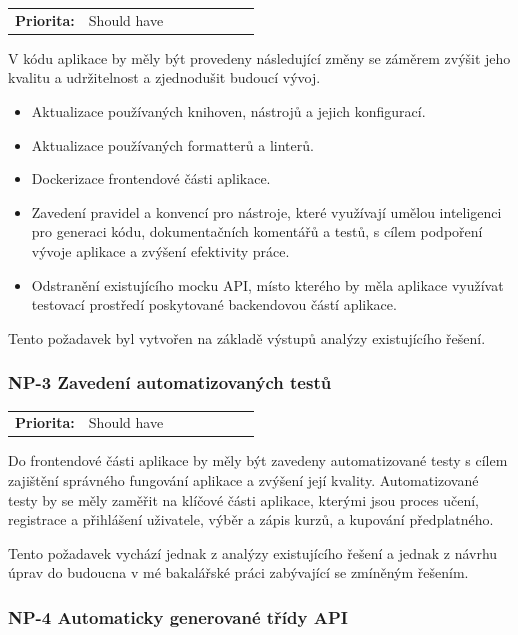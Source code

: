 \begin{tabular}{lp{0.7\linewidth}}
    \textbf{Priorita:} & Should have \\
\end{tabular}

V kódu aplikace by měly být provedeny následující změny se záměrem zvýšit jeho kvalitu a udržitelnost a zjednodušit budoucí vývoj.

\begin{itemize}
    \item Aktualizace používaných knihoven, nástrojů a jejich konfigurací.
    \item Aktualizace používaných formatterů a linterů.
    \item Dockerizace frontendové části aplikace.
    \item Zavedení pravidel a konvencí pro nástroje, které využívají umělou inteligenci pro generaci kódu, dokumentačních komentářů a testů, s cílem podpoření vývoje aplikace a zvýšení efektivity práce.
    \item Odstranění existujícího mocku API, místo kterého by měla aplikace využívat testovací prostředí poskytované backendovou částí aplikace.
\end{itemize}

Tento požadavek byl vytvořen na základě výstupů analýzy existujícího řešení.

\subsubsection{NP-3 Zavedení automatizovaných testů}

\begin{tabular}{lp{0.7\linewidth}}
    \textbf{Priorita:} & Should have \\
\end{tabular}

Do frontendové části aplikace by měly být zavedeny automatizované testy s cílem zajištění správného fungování aplikace a zvýšení její kvality. Automatizované testy by se měly zaměřit na klíčové části aplikace, kterými jsou proces učení, registrace a přihlášení uživatele, výběr a zápis kurzů, a kupování předplatného.

Tento požadavek vychází jednak z analýzy existujícího řešení a jednak z návrhu úprav do budoucna v mé bakalářské práci \cite{Jenicek2024BachelorThesis} zabývající se zmíněným řešením.

\subsubsection{NP-4 Automaticky generované třídy API}

